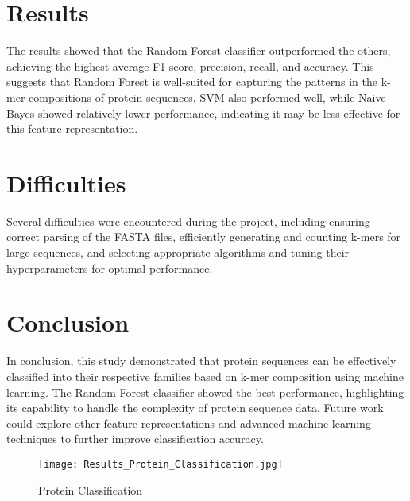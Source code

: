 \documentclass{article}
\begin{document}
\section*{Results}
The results showed that the Random Forest classifier outperformed the others, achieving the highest average F1-score, precision, recall, and accuracy. This suggests that Random Forest is well-suited for capturing the patterns in the k-mer compositions of protein sequences. SVM also performed well, while Naive Bayes showed relatively lower performance, indicating it may be less effective for this feature representation.

\section*{Difficulties}
Several difficulties were encountered during the project, including ensuring correct parsing of the FASTA files, efficiently generating and counting k-mers for large sequences, and selecting appropriate algorithms and tuning their hyperparameters for optimal performance.

\section*{Conclusion}
In conclusion, this study demonstrated that protein sequences can be effectively classified into their respective families based on k-mer composition using machine learning. The Random Forest classifier showed the best performance, highlighting its capability to handle the complexity of protein sequence data. Future work could explore other feature representations and advanced machine learning techniques to further improve classification accuracy.

\begin{figure}
    \centering
    \texttt{[image: Results\_Protein\_Classification.jpg]}
    \caption{Protein Classification}
    \label{fig:enter-label}
\end{figure}
\end{document}
